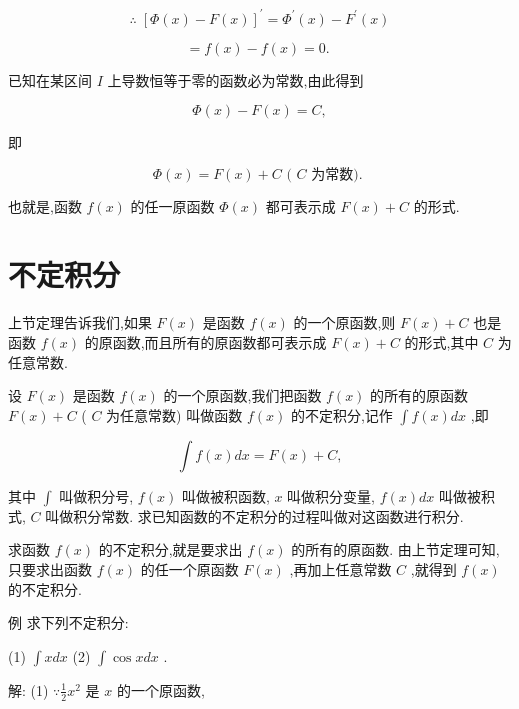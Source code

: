 \documentclass[lang=cn,newtx,12pt,scheme=chinese]{elegantbook}
\begin{document}
\[
\therefore \;{\left\lbrack \Phi \left( x\right) - F\left( x\right) \right\rbrack }^{\prime } = {\Phi }^{\prime }\left( x\right) - {F}^{\prime }\left( x\right)
\]

\[
= f\left( x\right) - f\left( x\right) = 0\text{. }
\]

已知在某区间 \(I\) 上导数恒等于零的函数必为常数,由此得到

\[
\Phi \left( x\right) - F\left( x\right) = C,
\]

即

\[
\Phi \left( x\right) = F\left( x\right) + C\text{ ( }C\text{ 为常数). }
\]

也就是,函数 \(f\left( x\right)\) 的任一原函数 \(\Phi \left( x\right)\) 都可表示成 \(F\left( x\right) + C\) 的形式.

\section{不定积分}

上节定理告诉我们,如果 \(F\left( x\right)\) 是函数 \(f\left( x\right)\) 的一个原函数,则 \(F\left( x\right) + C\) 也是函数 \(f\left( x\right)\) 的原函数,而且所有的原函数都可表示成 \(F\left( x\right) + C\) 的形式,其中 \(C\) 为任意常数.

\begin{definition}[定积分]


设 \(F\left( x\right)\) 是函数 \(f\left( x\right)\) 的一个原函数,我们把函数 \(f\left( x\right)\) 的所有的原函数 \(F\left( x\right) + C\) ( \(C\) 为任意常数) 叫做函数 \(f\left( x\right)\) 的不定积分,记作 \(\int f\left( x\right) {dx}\) ,即

\[
\int f\left( x\right) {dx} = F\left( x\right) + C,
\]

其中 \(\int\) 叫做积分号, \(f\left( x\right)\) 叫做被积函数, \(x\) 叫做积分变量, \(f\left( x\right) {dx}\) 叫做被积式, \(C\) 叫做积分常数. 求已知函数的不定积分的过程叫做对这函数进行积分.

\end{definition}

求函数 \(f\left( x\right)\) 的不定积分,就是要求出 \(f\left( x\right)\) 的所有的原函数. 由上节定理可知,只要求出函数 \(f\left( x\right)\) 的任一个原函数 \(F\left( x\right)\) ,再加上任意常数 \(C\) ,就得到 \(f\left( x\right)\) 的不定积分.

例 求下列不定积分:

(1) \(\int {xdx}\) (2) \(\int \cos {xdx}\) .

解: (1) \(\because \frac{1}{2}{x}^{2}\) 是 \(x\) 的一个原函数,
\end{document}
